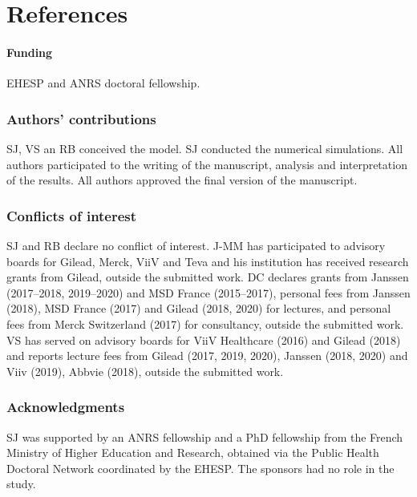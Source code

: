 \documentclass[preprint,review,12pt]{article}			%
\begin{document}

\section{References}






\paragraph{Funding}
EHESP and ANRS doctoral fellowship.

\subsubsection*{Authors' contributions}
SJ, VS an RB conceived the model. SJ conducted the numerical simulations. All authors participated to the writing of the manuscript, analysis and interpretation of the results. All authors approved the final version of the manuscript.

\subsubsection*{Conflicts of interest}
SJ and RB declare no conflict of interest. 
%
J-MM has participated to advisory boards for Gilead, Merck, ViiV and Teva and his institution has received research grants from Gilead, outside the submitted work. 
%
DC declares grants from Janssen (2017--2018, 2019--2020) and MSD France (2015--2017), personal fees from Janssen (2018), MSD France (2017) and Gilead (2018, 2020) for lectures, and personal fees from Merck Switzerland (2017) for consultancy, outside the submitted work. 
%
VS has served on advisory boards for ViiV Healthcare (2016) and Gilead (2018) and reports lecture fees from Gilead (2017, 2019, 2020), Janssen (2018, 2020) and Viiv (2019), Abbvie (2018), outside the submitted work. 

\subsubsection*{Acknowledgments}
SJ was supported by an ANRS fellowship and a PhD fellowship from the French Ministry of Higher Education and Research, obtained via the Public Health Doctoral Network coordinated by the EHESP. The sponsors had no role in the study.
\end{document}
